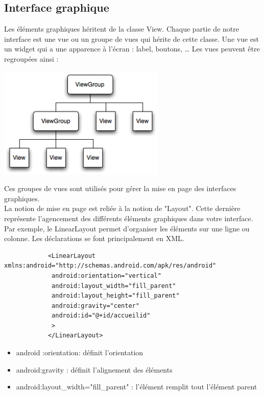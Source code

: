 \documentclass[a4paper]{report}
\begin{document}
		\subsection{Interface graphique}
			Les éléments graphiques héritent de la classe View. Chaque partie de notre interface est une vue ou un groupe de vues qui hérite de cette classe. Une vue est un widget qui a une 				apparence à l’écran : label, boutons, … Les vues peuvent être regroupées ainsi :\\
			\begin{center}
				\includegraphics[scale=0.5]{Images/viewgroup.png}
			\end{center}
			Ces groupes de vues sont utilisés pour gérer la mise en page des interfaces graphiques.\\

			La notion de mise en page est reliée à la notion de "Layout". Cette dernière représente l'agencement des différents éléments graphiques dans votre interface. Par exemple, le 				LinearLayout permet d’organiser les éléments sur une ligne ou colonne. Les déclarations se font principalement en XML.\\
			\begin{verbatim}
			<LinearLayout xmlns:android="http://schemas.android.com/apk/res/android"
			 android:orientation="vertical"
			 android:layout_width="fill_parent"
			 android:layout_height="fill_parent"
			 android:gravity="center"
			 android:id="@+id/accueilid"
			 >
			</LinearLayout>
			\end{verbatim}
			\begin{itemize}
				\item android :orientation: définit l'orientation
	  			\item android:gravity : définit l'alignement des éléments
				\item android:layout\_width="fill\_parent" : l'élément remplit tout l'élément parent
			\end{itemize}
\end{document}
